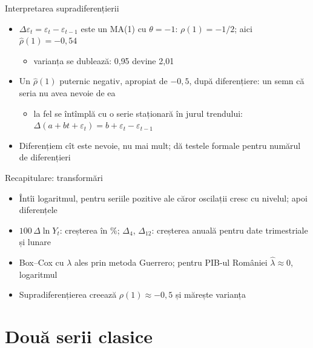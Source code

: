 \begin{frame}{Interpretarea supradiferențierii}
\itemsize{\small}
\begin{itemize}
    \item $\Delta\varepsilon_t = \varepsilon_t - \varepsilon_{t-1}$ este un MA(1) cu $\theta = -1$: $\rho(1) = -1/2$; aici $\hat\rho(1) = \ensuremath{-}0{,}54$
    \begin{itemize}
        \item varianța se dublează: 0{,}95 devine 2{,}01
    \end{itemize}
    \item Un $\hat\rho(1)$ puternic negativ, apropiat de $-0{,}5$, după diferențiere: un semn că seria nu avea nevoie de ea
    \begin{itemize}
        \item la fel se întîmplă cu o serie staționară în jurul trendului: $\Delta(a + bt + \varepsilon_t) = b + \varepsilon_t - \varepsilon_{t-1}$
    \end{itemize}
    \item Diferențiem cît este nevoie, nu mai mult;  dă testele formale pentru numărul de diferențieri
\end{itemize}
\end{frame}

\begin{frame}{Recapitulare: transformări}
\itemsize{\small}
\begin{itemize}
    \item Întîi logaritmul, pentru seriile pozitive ale căror oscilații cresc cu nivelul; apoi diferențele
    \item $100\,\Delta\ln Y_t$: creșterea în \%; $\Delta_4$, $\Delta_{12}$: creșterea anuală pentru date trimestriale și lunare
    \item Box--Cox cu $\lambda$ ales prin metoda Guerrero; pentru PIB-ul României $\hat\lambda \approx 0$, logaritmul
    \item Supradiferențierea creează $\rho(1) \approx -0{,}5$ și mărește varianța
\end{itemize}
\end{frame}


\section{Două serii clasice}

